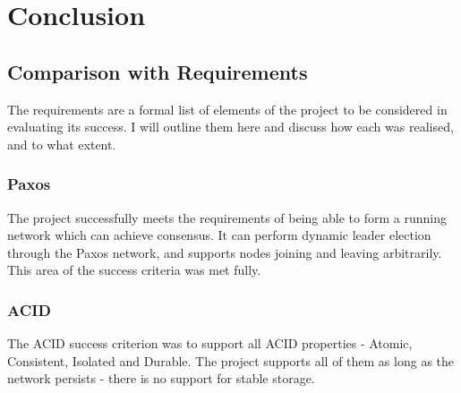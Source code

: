 \documentclass[12pt,twoside,notitlepage]{report}
\begin{document}



\cleardoublepage
\chapter{Conclusion}

\section{Comparison with Requirements}

The requirements are a formal list of elements of the project to be
considered in evaluating its success. I will outline them here and discuss how each was realised,
and to what extent.

\subsection{Paxos}

The project successfully meets the requirements of being able to form a running network which can
achieve consensus. It can perform dynamic leader election through the Paxos network, and
supports nodes joining and leaving arbitrarily. This area of the success criteria was met fully.

\subsection{ACID}

The ACID success criterion was to support all ACID properties - Atomic, Consistent, Isolated and
Durable. The project supports all of them as long as the network persists - there is no support
for stable storage.
\end{document}
